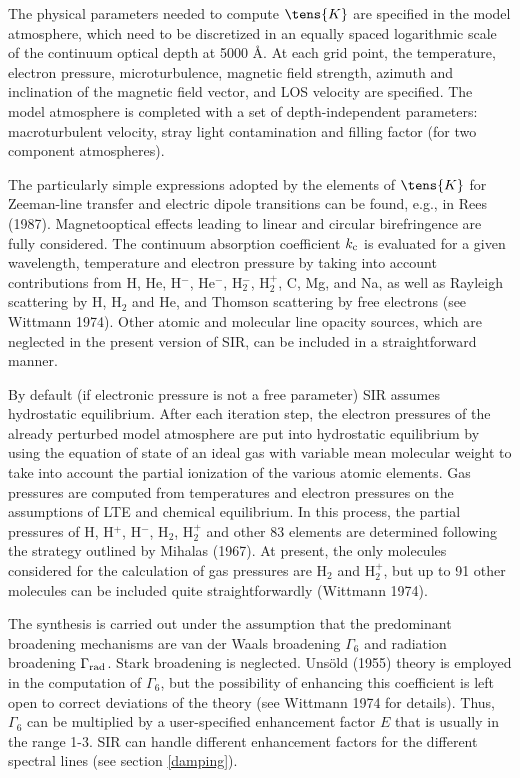 The physical parameters needed to compute $\tens{K}$ are specified in
the model atmosphere, which need to be discretized in an equally
spaced logarithmic scale of the continuum optical depth at 5000 \AA\/.
At each grid point, the temperature, electron pressure,
microturbulence, magnetic field strength, azimuth and inclination of
the magnetic field vector, and LOS velocity are specified. The model
atmosphere is completed with a set of depth-independent parameters:
macroturbulent velocity, stray light contamination and filling factor
(for two component atmospheres).

The particularly simple expressions adopted by the elements of
$\tens{K}$ for Zeeman-line transfer and electric dipole transitions can
be found, e.g., in Rees (1987). Magnetooptical effects leading to
linear and circular birefringence are fully considered. The continuum
absorption coefficient $k_{\rm c}$ is evaluated for a given wavelength,
temperature and electron pressure by taking into account
contributions from H, He, H$^{-}$, He$^{-}$, H$_2^-$, H$_2^+$, C, Mg,
and Na, as well as Rayleigh scattering by H, H$_2$ and He, and Thomson
scattering by free electrons (see Wittmann 1974).  Other atomic and
molecular line opacity sources, which are neglected in the present
version of SIR, can be included in a straightforward manner.

By default (if electronic pressure is not a free parameter) SIR assumes 
hydrostatic equilibrium. After each iteration step, the 
electron pressures of the already perturbed model atmosphere are put into 
hydrostatic equilibrium by using the equation of state of
an ideal gas with variable mean molecular weight to take into account
the partial ionization of the various atomic elements. Gas pressures
are computed from temperatures and electron pressures on the
assumptions of LTE and chemical equilibrium. In this process, the
partial pressures of H, H$^+$, H$^-$, H$_2$, H$_2^+$ and other 83
elements  are determined following the strategy outlined by Mihalas
(1967). At present, the only molecules considered for the calculation
of gas pressures are H$_2$ and H$_2^+$, but up to 91 other molecules can
be included quite straightforwardly (Wittmann 1974).

The synthesis is carried out under the assumption that the predominant
broadening mechanisms are van der Waals broadening $\Gamma_6$ and
radiation broadening $\Gamma_{\rm rad}$. Stark broadening is
neglected.  Uns\"old (1955) theory is employed in the computation of
$\Gamma_6$, but the possibility of enhancing this coefficient is left
open to correct deviations of the theory (see Wittmann 1974 for
details). Thus, $\Gamma_6$ can be multiplied by a user-specified
enhancement factor $E$ that is usually in the range 1-3. SIR can handle
different enhancement factors for the different spectral lines (see 
section \ref{damping}).

